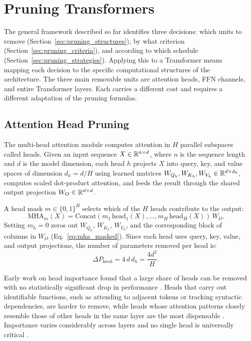\section{Pruning Transformers}
\label{sec:pruning_transformers}

The general framework described so far identifies three decisions: which
units to remove (Section~\ref{sec:pruning_structures}), by what criterion
(Section~\ref{sec:pruning_criteria}), and according to which schedule
(Section~\ref{sec:pruning_strategies}). Applying
this to a Transformer means mapping each decision to the specific computational
structures of the architecture. The three main removable units are attention
heads, FFN channels, and entire Transformer layers. Each carries a different
cost and requires a different adaptation of the pruning formulas.

\subsection{Attention Head Pruning}
\label{subsec:attention_head_pruning}

The multi-head attention module computes attention in $H$ parallel subspaces
called heads. Given an input sequence $X \in \mathbb{R}^{n \times d}$, where $n$ is
the sequence length and $d$ is the model dimension, each head $h$ projects $X$
into query, key, and value spaces of dimension $d_h = d/H$ using learned
matrices $W_{Q_h}, W_{K_h}, W_{V_h} \in \mathbb{R}^{d \times d_h}$, computes scaled
dot-product attention, and feeds the result through the shared output
projection $W_O \in \mathbb{R}^{d \times d}$.

A head mask $m \in \{0,1\}^H$ selects which of the $H$ heads contribute to
the output:
\begin{equation}
	\mathrm{MHA}_m(X) = \mathrm{Concat}(m_1\,\mathrm{head}_1(X), \ldots,
	m_H\,\mathrm{head}_H(X))\,W_O.
	\label{eq:mha_masked}
\end{equation}
Setting $m_h = 0$ zeros out $W_{Q_h}$, $W_{K_h}$, $W_{V_h}$, and the
corresponding block of columns in $W_O$ (Eq.~\eqref{eq:mha_masked}). Since each head uses query, key, value, and output projections, the number of parameters removed per
head is:
\begin{equation}
	\Delta P_{\mathrm{head}} = 4\,d\,d_h = \frac{4d^2}{H}.
	\label{eq:head_params}
\end{equation}

Early work on head importance found that a large share of heads can be removed
with no statistically significant drop in performance \cite{michel2022not,voita2019analyzing}.
Heads that carry out identifiable functions, such as attending to adjacent
tokens or tracking syntactic dependencies, are harder to remove, while heads
whose attention patterns closely resemble those of other heads in the same
layer are the most dispensable \cite{voita2019analyzing}. Importance varies
considerably across layers and no single head is universally critical
\cite{michel2022not}.

